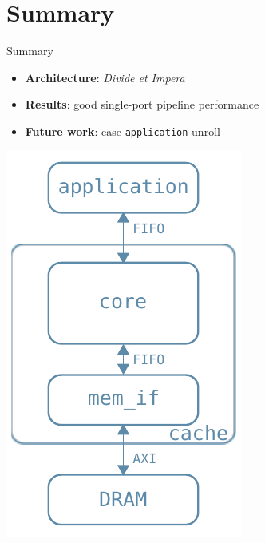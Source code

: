 \documentclass[handout,aspectratio=169]{beamer}
\begin{document}
\section*{Summary}
\begin{frame}{Summary}
	\begin{minipage}{.7\textwidth}
		\begin{itemize}
			\item \textbf{Architecture}: \emph{Divide et Impera}
			\item \textbf{Results}:
				good single-port pipeline performance
			\item \textbf{Future work}: ease \texttt{application} unroll
		\end{itemize}
	\end{minipage}
	\begin{minipage}{.28\textwidth}
		\begin{center}
			\includegraphics[width=.8\textwidth]{internal_arch.pdf}
		\end{center}
	\end{minipage}
\end{frame}
\end{document}
